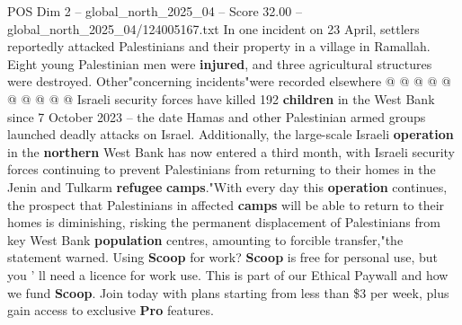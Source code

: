 \begin{textsample}{POS Dim 2 – global\_north\_2025\_04 – Score 32.00 – global\_north\_2025\_04/124005167.txt}
In one incident on 23 April, settlers reportedly attacked Palestinians and their property in a village in Ramallah.
Eight young Palestinian men were \textbf{injured}, and three agricultural structures were destroyed.
Other"concerning incidents"were recorded elsewhere @ @ @ @ @ @ @ @ @ @ Israeli security forces have killed 192 \textbf{children} in the West Bank since 7 October 2023 -- the date Hamas and other Palestinian armed groups launched deadly attacks on Israel.
Additionally, the large-scale Israeli \textbf{operation} in the \textbf{northern} West Bank has now entered a third month, with Israeli security forces continuing to prevent Palestinians from returning to their homes in the Jenin and Tulkarm \textbf{refugee} \textbf{camps}."With every day this \textbf{operation} continues, the prospect that Palestinians in affected \textbf{camps} will be able to return to their homes is diminishing, risking the permanent displacement of Palestinians from key West Bank \textbf{population} centres, amounting to forcible transfer,"the statement warned.
Using \textbf{Scoop} for work? \textbf{Scoop} is free for personal use, but you ' ll need a licence for work use.
This is part of our Ethical Paywall and how we fund \textbf{Scoop}.
Join today with plans starting from less than \$3 per week, plus gain access to exclusive \textbf{Pro} features.

\end{textsample}
